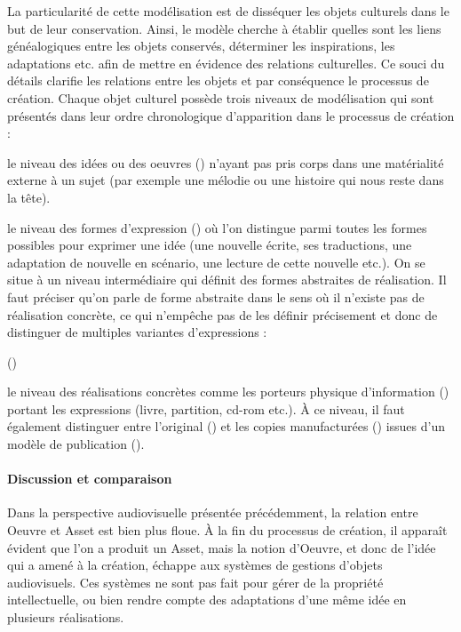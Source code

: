 La particularité de cette modélisation est de disséquer les objets culturels dans le but de leur conservation.
Ainsi, le modèle cherche à établir quelles sont les liens généalogiques entre les objets conservés, déterminer les inspirations, les adaptations etc. afin de mettre en évidence des relations culturelles.
Ce souci du détails clarifie les relations entre les objets et par conséquence le processus de création. 
Chaque objet culturel possède trois niveaux de modélisation qui sont présentés dans leur ordre chronologique d'apparition dans le processus de création :
\begin{liste}
	\item le niveau des idées ou des oeuvres () n’ayant pas pris corps dans une matérialité externe à un sujet (par exemple une mélodie ou une histoire qui nous reste dans la tête). 

	\item le niveau des formes d'expression () où l'on distingue parmi toutes les formes possibles pour exprimer une idée (une nouvelle écrite, ses traductions, une adaptation de nouvelle en scénario, une lecture de cette nouvelle etc.).
	On se situe à un niveau intermédiaire qui définit des formes abstraites de  réalisation.
	Il faut préciser qu'on parle de forme abstraite dans le sens où il n'existe pas de réalisation concrète, ce qui n'empêche pas de les définir précisement et donc de distinguer de multiples variantes d'expressions :

	 (\cite{Aalberg2008})
	
	\item le niveau des réalisations concrètes comme les porteurs physique d’information () portant les expressions (livre, partition, cd-rom etc.). 
	À ce niveau, il faut également distinguer entre l’original () et les copies manufacturées () issues d’un modèle de publication (). %
\end{liste}

\paragraph{Discussion et comparaison}
Dans la perspective audiovisuelle présentée précédemment, la relation entre Oeuvre et Asset est bien plus floue.
À la fin du processus de création, il apparaît évident que l'on a produit un Asset, mais la notion d'Oeuvre, et donc de l'idée qui a amené à la création, échappe aux systèmes de gestions d'objets audiovisuels.
Ces systèmes ne sont pas fait pour gérer de la propriété intellectuelle, ou bien rendre compte des adaptations d'une même idée en plusieurs réalisations.

